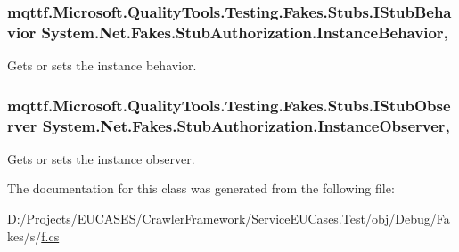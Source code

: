\hypertarget{class_system_1_1_net_1_1_fakes_1_1_stub_authorization_a865ff3d3045430d92b8c1ad7850fdee6}{
\subsubsection[{Instance\-Behavior}]{\setlength{\rightskip}{0pt plus 5cm}mqttf.\-Microsoft.\-Quality\-Tools.\-Testing.\-Fakes.\-Stubs.\-I\-Stub\-Behavior System.\-Net.\-Fakes.\-Stub\-Authorization.\-Instance\-Behavior\hspace{0.3cm}{\ttfamily [get]}, {\ttfamily [set]}}}\label{class_system_1_1_net_1_1_fakes_1_1_stub_authorization_a865ff3d3045430d92b8c1ad7850fdee6}


Gets or sets the instance behavior.

\hypertarget{class_system_1_1_net_1_1_fakes_1_1_stub_authorization_a96633714e28258c587ce9d47eb7168a9}{
\subsubsection[{Instance\-Observer}]{\setlength{\rightskip}{0pt plus 5cm}mqttf.\-Microsoft.\-Quality\-Tools.\-Testing.\-Fakes.\-Stubs.\-I\-Stub\-Observer System.\-Net.\-Fakes.\-Stub\-Authorization.\-Instance\-Observer\hspace{0.3cm}{\ttfamily [get]}, {\ttfamily [set]}}}\label{class_system_1_1_net_1_1_fakes_1_1_stub_authorization_a96633714e28258c587ce9d47eb7168a9}


Gets or sets the instance observer.



The documentation for this class was generated from the following file\-:\begin{DoxyCompactItemize}
\item 
D\-:/\-Projects/\-E\-U\-C\-A\-S\-E\-S/\-Crawler\-Framework/\-Service\-E\-U\-Cases.\-Test/obj/\-Debug/\-Fakes/s/\hyperlink{s_2f_8cs}{f.\-cs}\end{DoxyCompactItemize}
